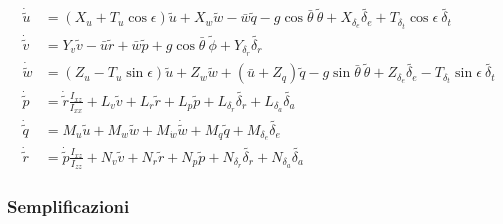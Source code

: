 \begin{equation*}
    \begin{split}
        \dot{\widetilde{u}} & = (X_u + T_u \cos\epsilon)\widetilde{u} + X_w\widetilde{w} -\bar{w}\widetilde{q} -g\cos\bar{\theta}\:\widetilde{\theta} + X_{\delta_e}\widetilde{\delta_e} + T_{\delta_t}\cos\epsilon\:\widetilde{\delta_t}          \\
        \dot{\widetilde{v}} & = Y_v\widetilde{v} - \bar{u}\widetilde{r} + \bar{w}\widetilde{p} + g\cos\bar{\theta}\:\widetilde{\phi} + Y_{\delta_r}\widetilde{\delta_r}                                                                            \\
        \dot{\widetilde{w}} & = (Z_u - T_u\sin\epsilon)\widetilde{u} + Z_w\widetilde{w} + (\bar{u} + Z_q)\widetilde{q} - g\sin\bar{\theta}\:\widetilde{\theta} + Z_{\delta_e}\widetilde{\delta_e} - T_{\delta_t}\sin\epsilon\:\widetilde{\delta_t} \\
        \dot{\widetilde{p}} & = \dot{\widetilde{r}}\frac{I_{xz}}{I_{xx}} + L_v\widetilde{v} + L_r\widetilde{r} + L_p\widetilde{p} + L_{\delta_r}\widetilde{\delta_r }+ L_{\delta_a}\widetilde{\delta_a}                                            \\
        \dot{\widetilde{q}} & = M_u\widetilde{u} + M_w\widetilde{w} + M_{\dot{w}}\dot{\widetilde{w}} + M_q\widetilde{q} + M_{\delta_e}\widetilde{\delta_e}                                                                                         \\
        \dot{\widetilde{r}} & = \dot{\widetilde{p}}\frac{I_{xz}}{I_{zz}} + N_v\widetilde{v} + N_r\widetilde{r} + N_p\widetilde{p} + N_{\delta_r}\widetilde{\delta_r} + N_{\delta_a}\widetilde{\delta_a}
    \end{split}
\end{equation*}

\subsubsection{Semplificazioni}

